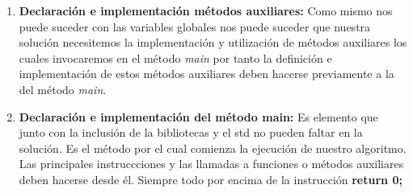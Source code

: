 \begin{enumerate}
	\item \textbf{Declaración e implementación métodos auxiliares:} Como mismo nos puede suceder con las variables globales nos puede suceder que nuestra solución necesitemos la implementación y utilización de métodos auxiliares los cuales invocaremos en el método \emph{main} por tanto la definición e implementación de estos métodos auxiliares deben hacerse previamente a la del método \emph{main}.
	\item \textbf{Declaración e implementación del método main:} Es elemento que junto con la inclusión de la bibliotecas y el std no pueden faltar en la solución. Es el método por el cual comienza la ejecución de nuestro algoritmo. Las principales instruccciones y las llamadas a funciones o métodos auxiliares deben hacerse desde él. Siempre todo por encima de la instrucción \textbf{return 0;} 
\end{enumerate}